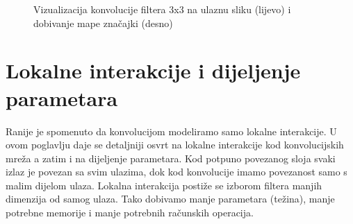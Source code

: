 \documentclass[times, utf8, diplomski]{fer}
\theoremstyle{definition}
\begin{document}
\begin{figure}[h]
\begin{center}
\qquad
{}
\end{center}
\caption{Vizualizacija konvolucije filtera 3x3 na ulaznu sliku (lijevo) i dobivanje mape značajki (desno) }
\end{figure}
\newpage
\section{Lokalne interakcije i dijeljenje parametara}
Ranije je spomenuto da konvolucijom modeliramo samo lokalne interakcije. U ovom poglavlju daje se detaljniji osvrt na lokalne interakcije kod konvolucijskih mreža a zatim i na dijeljenje parametara.
Kod potpuno povezanog sloja svaki izlaz je povezan sa svim ulazima, dok kod konvolucije imamo povezanost samo s malim dijelom ulaza. Lokalna interakcija postiže se izborom filtera manjih dimenzija od samog ulaza. Tako dobivamo manje parametara (težina), manje potrebne memorije i manje potrebnih računskih operacija.
\end{document}
